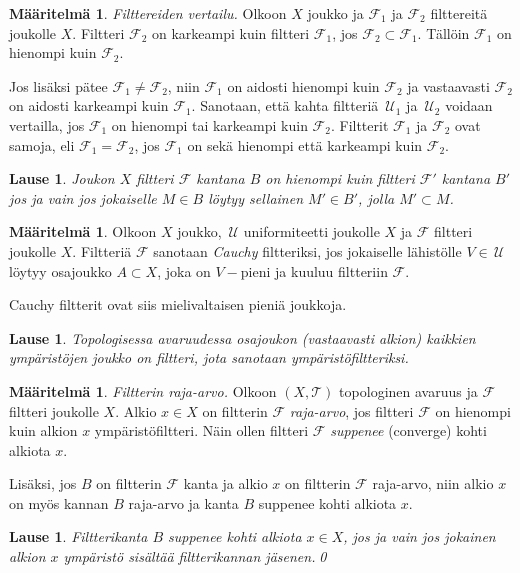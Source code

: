 \documentclass[12pt,a4paper,leqno]{report}
\newcommand{\U}{\,\mathcal{U}}
\newcommand{\T}{\mathcal{T}}
\newcommand{\F}{\mathcal{F}}
\theoremstyle{plain}
\newtheorem{lause}[equation]{Lause}
\theoremstyle{definition}
\newtheorem{maar}[equation]{Määritelmä}
\theoremstyle{remark}
\begin{document}
\begin{maar}
\emph{Filttereiden vertailu.}
Olkoon $X$ joukko ja $\F_1$ ja $\F_2$ filttereitä joukolle $X$. 
Filtteri $\F_2$ on karkeampi kuin filtteri $\F_1$, jos $\F_2\subset \F_1$. 
Tällöin $\F_1$ on hienompi kuin $\F_2$. 

Jos lisäksi pätee $\F_1\neq\F_2$, niin $\F_1$ on aidosti hienompi kuin $\F_2$ ja vastaavasti $\F_2$ on aidosti karkeampi kuin $\F_1$. 
Sanotaan, että kahta filtteriä $\U_1$ ja $\U_2$ voidaan vertailla, 
jos $\F_1$ on hienompi tai karkeampi kuin $\F_2$. 
Filtterit $\F_1$ ja $\F_2$ ovat samoja, eli $\F_1=\F_2$,
jos $\F_1$ on sekä hienompi että karkeampi kuin $\F_2$.
\end{maar}
\begin{lause}
Joukon $X$ filtteri $\F$ kantana $B$ on hienompi kuin 
filtteri $\F'$ kantana $B'$ jos ja vain jos jokaiselle $M\in B$ löytyy 
sellainen $M'\in B'$, jolla $M'\subset M$.
\end{lause}
\begin{maar}\label{Cauchy_filtteri}
Olkoon $X$ joukko, $\U$ uniformiteetti joukolle $X$ ja $\F$ filtteri joukolle $X$. 
Filtteriä $\F$ sanotaan \emph{Cauchy} filtteriksi, 
jos jokaiselle lähistölle $V\in\U$ löytyy osajoukko $A\subset X$, 
joka on $V-$pieni ja kuuluu filtteriin $\F$. %
\end{maar}
\noindent Cauchy filtterit ovat siis mielivaltaisen pieniä joukkoja. 
\begin{lause}
Topologisessa avaruudessa osajoukon (vastaavasti alkion) kaikkien ympäristöjen joukko on filtteri, jota sanotaan ympäristöfiltteriksi.
\end{lause}
\begin{maar}
\emph{Filtterin raja-arvo.} 
Olkoon $(X,\T)$ topologinen avaruus ja $\F$ filtteri joukolle $X$. 
Alkio $x\in X$ on filtterin $\F$ \emph{raja-arvo}, 
jos filtteri $\F$ on hienompi kuin 
alkion $x$ ympäristöfiltteri. %
Näin ollen filtteri $\F$ \emph{suppenee} (converge) kohti alkiota $x$. 

Lisäksi, jos $B$ on filtterin $\F$ kanta 
ja alkio $x$ on filtterin $\F$ raja-arvo, 
niin alkio $x$ on myös kannan $B$ raja-arvo ja 
kanta $B$ suppenee kohti alkiota $x$.
\end{maar}
\begin{lause}
Filtterikanta $B$ suppenee kohti alkiota $x\in X$, jos ja vain jos 
jokainen alkion $x$ ympäristö sisältää filtterikannan jäsenen.\qed
\end{lause}
\end{document}

